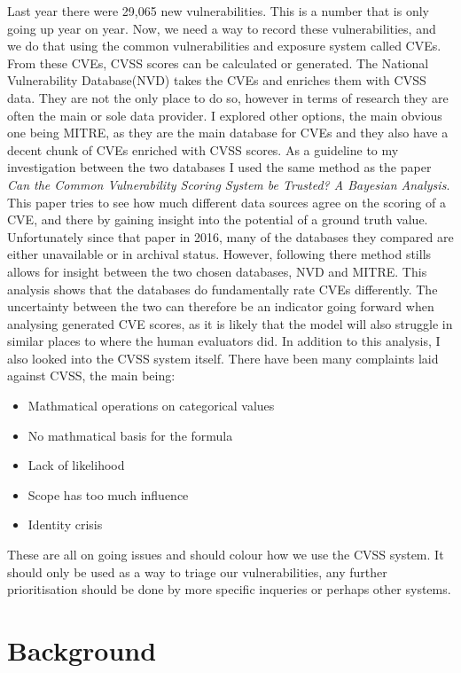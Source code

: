 \documentclass[12pt]{article}
\begin{document}
Last year there were 29,065 new vulnerabilities. This is a number that is only going up year on year. Now, we need a way to record these
vulnerabilities, and we do that using the common vulnerabilities and exposure system called CVEs. From these CVEs, CVSS scores can be calculated or
generated. The National Vulnerability Database(NVD) takes the CVEs and enriches them with CVSS data. They are not the only place to do so, however in
terms of research they are often the main or sole data provider. I explored other options, the main obvious one being MITRE, as they are the main
database for CVEs and they also have a decent chunk of CVEs enriched with CVSS scores. As a guideline to my investigation between the two databases I
used the same method as the paper \textit{Can the Common Vulnerability Scoring System be Trusted? A Bayesian Analysis}.\cite{bayes} This paper tries
to see how much different data sources agree on the scoring of a CVE, and there by gaining insight into the potential of a ground truth value.
Unfortunately since that paper in 2016, many of the databases they compared are either unavailable or in archival status. However, following there
method stills allows for insight between the two chosen databases, NVD and MITRE. This analysis shows that the databases do fundamentally rate CVEs
differently. The uncertainty between the two can therefore be an indicator going forward when analysing generated CVE scores, as it is likely that the
model will also struggle in similar places to where the human evaluators did. In addition to this analysis, I also looked into the CVSS system itself.
There have been many complaints laid against CVSS\cite{ubiquitous}\cite{improving_cvss}, the main being:

\begin{itemize}
	\item Mathmatical operations on categorical values
	\item No mathmatical basis for the formula
	\item Lack of likelihood
	\item Scope has too much influence
	\item Identity crisis
\end{itemize}

These are all on going issues and should colour how we use the CVSS system. It should only be used as a way to triage our vulnerabilities, any further
prioritisation should be done by more specific inqueries or perhaps other systems.

\section{Background}
\end{document}
